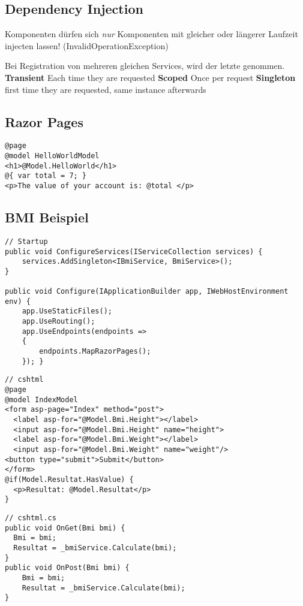 \begin{multicols*}{2}
\subsection{Dependency Injection}
Komponenten dürfen sich \textit{nur} Komponenten mit gleicher oder längerer Laufzeit injecten lassen! (InvalidOperationException)

Bei Registration von mehreren gleichen Services, wird der letzte genommen.
\textbf{Transient} Each time they are requested \textbf{Scoped} Once per request \textbf{Singleton} first time they are requested, same instance afterwards

\subsection{Razor Pages}
\begin{verbatim}
@page
@model HelloWorldModel
<h1>@Model.HelloWorld</h1>
@{ var total = 7; }
<p>The value of your account is: @total </p>
\end{verbatim}

\subsection{BMI Beispiel}
\begin{verbatim}
// Startup
public void ConfigureServices(IServiceCollection services) {
    services.AddSingleton<IBmiService, BmiService>();
}

public void Configure(IApplicationBuilder app, IWebHostEnvironment env) {
    app.UseStaticFiles();
    app.UseRouting();
    app.UseEndpoints(endpoints =>
    {
        endpoints.MapRazorPages();
    }); }
\end{verbatim}
\begin{verbatim}
// cshtml
@page
@model IndexModel
<form asp-page="Index" method="post">
  <label asp-for="@Model.Bmi.Height"></label>
  <input asp-for="@Model.Bmi.Height" name="height">
  <label asp-for="@Model.Bmi.Weight"></label>
  <input asp-for="@Model.Bmi.Weight" name="weight"/>
<button type="submit">Submit</button>
</form>
@if(Model.Resultat.HasValue) {
  <p>Resultat: @Model.Resultat</p>
}
\end{verbatim}
\begin{verbatim}
// cshtml.cs
public void OnGet(Bmi bmi) {
  Bmi = bmi;
  Resultat = _bmiService.Calculate(bmi);
}
public void OnPost(Bmi bmi) {
    Bmi = bmi;
    Resultat = _bmiService.Calculate(bmi);
}
\end{verbatim}


\end{multicols*}
